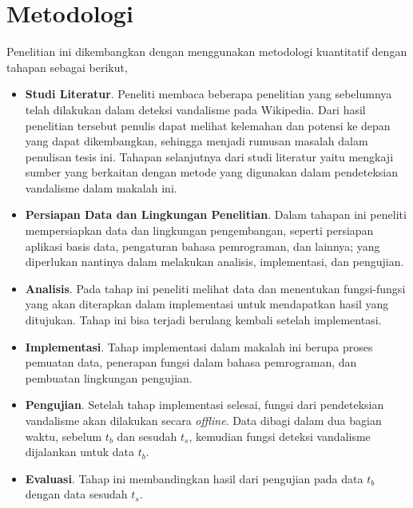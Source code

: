 \section{Metodologi}\label{sec:metodologi}

Penelitian ini dikembangkan dengan menggunakan metodologi kuantitatif dengan tahapan sebagai berikut,
\begin{itemize}
	\item \textbf{Studi Literatur}. Peneliti membaca beberapa penelitian yang sebelumnya telah dilakukan dalam deteksi vandalisme pada Wikipedia. Dari hasil penelitian tersebut penulis dapat melihat kelemahan dan potensi ke depan yang dapat dikembangkan, sehingga menjadi rumusan masalah dalam penulisan tesis ini. Tahapan selanjutnya dari studi literatur yaitu mengkaji sumber yang berkaitan dengan metode yang digunakan dalam pendeteksian vandalisme dalam makalah ini.
	\item \textbf{Persiapan Data dan Lingkungan Penelitian}. Dalam tahapan ini peneliti mempersiapkan data dan lingkungan pengembangan, seperti persiapan aplikasi basis data, pengaturan bahasa pemrograman, dan lainnya; yang diperlukan nantinya dalam melakukan analisis, implementasi, dan pengujian.
	\item \textbf{Analisis}. Pada tahap ini peneliti melihat data dan menentukan fungsi-fungsi yang akan diterapkan dalam implementasi untuk mendapatkan hasil yang ditujukan. Tahap ini bisa terjadi berulang kembali setelah implementasi.
	\item \textbf{Implementasi}. Tahap implementasi dalam makalah ini berupa proses pemuatan data, penerapan fungsi dalam bahasa pemrograman, dan pembuatan lingkungan pengujian.
	\item \textbf{Pengujian}. Setelah tahap implementasi selesai, fungsi dari pendeteksian vandalisme akan dilakukan secara \textit{offline}. Data dibagi dalam dua bagian waktu, sebelum $ t_{b} $ dan sesudah $ t_{s} $, kemudian fungsi deteksi vandalisme dijalankan untuk data $t_{b}$.
	\item \textbf{Evaluasi}. Tahap ini membandingkan hasil dari pengujian pada data $t_{b}$ dengan data sesudah $t_{s}$.
	
\end{itemize}